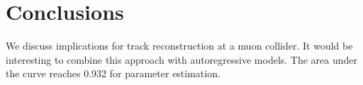 \section{Conclusions}\label{sec:conclusions}

We discuss implications for track reconstruction at a muon collider. It
would be interesting to combine this approach with autoregressive
models. The area under the curve reaches 0.932 for parameter estimation.

